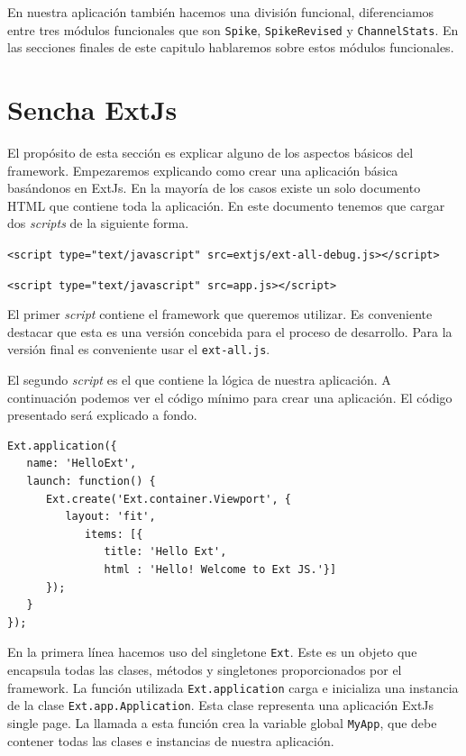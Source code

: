 \par
En nuestra aplicación también hacemos una división funcional, diferenciamos entre tres módulos funcionales que son \texttt{Spike},
\texttt{SpikeRevised} y \texttt{ChannelStats}. En las secciones finales de este capitulo hablaremos sobre estos módulos funcionales. 

\section{Sencha ExtJs}
	El propósito de esta sección es explicar alguno de los aspectos básicos del framework. Empezaremos explicando como crear una aplicación básica
	basándonos en ExtJs. En la mayoría de los casos existe un solo documento HTML\cite{HTML} que contiene toda la aplicación. En este documento
	tenemos que cargar dos \emph{scripts} de la siguiente forma.
    		\begin{center} \texttt{<script type="text/javascript" src=\textquotedbl extjs/ext-all-debug.js\textquotedbl ></script>}  \end{center}
    		\begin{center} \texttt{<script type="text/javascript" src=\textquotedbl app.js\textquotedbl ></script>}  \end{center}
 	El primer \emph{script} contiene el framework que queremos utilizar. Es conveniente destacar que esta es una versión concebida para el proceso
	de desarrollo. Para la versión final es conveniente usar el \texttt{ext-all.js}.
 	\par
 	El segundo \emph{script} es el que contiene la lógica de nuestra aplicación. A continuación podemos ver el código mínimo para crear una
	aplicación. El código presentado será explicado a fondo.
	\begin{lstlisting}
Ext.application({
   name: 'HelloExt',
   launch: function() {
      Ext.create('Ext.container.Viewport', {
         layout: 'fit',
            items: [{
               title: 'Hello Ext',
               html : 'Hello! Welcome to Ext JS.'}] 
      }); 
   } 
});
	\end{lstlisting}
 	En la primera línea hacemos uso del singletone \texttt{Ext}. Este es un objeto que encapsula todas las clases, métodos y singletones
	proporcionados por el framework. La función utilizada \texttt{Ext.application} carga e inicializa una instancia de la clase
	\texttt{Ext.app.Application}. Esta clase representa una aplicación ExtJs single page. La llamada a esta función crea la variable global
	\texttt{MyApp}, que debe contener todas las clases e instancias de nuestra aplicación.
